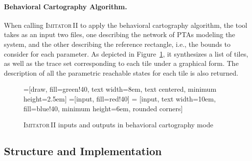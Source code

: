 \documentclass[a4paper,10pt]{article}
\newcommand{\A}{\mathcal{A}}
\newcommand{\imitatordeux}{\textsc{Imitator}\,II}
\newcommand{\paragraphe}[1]{\paragraph{#1.}}
\begin{document}
\paragraphe{Behavioral Cartography Algorithm}
When calling \imitatordeux{} to apply the behavioral cartography algorithm, the tool takes as an input two files, one describing the network of PTAs modeling the system, and the other describing the reference rectangle, i.e., the bounds to consider for each parameter.
As depicted in Figure~\ref{fig:ioBC}, it synthesizes a list of tiles, as well as the trace set corresponding to each tile under a graphical form.
The description of all the parametric reachable states for each tile is also returned.

\begin{figure}[ht!]
=[draw, fill=green!40, text width=8em,
    text centered, minimum height=2.5em]
=[input, fill=red!40]
 = [input, text width=10em, fill=blue!40,
    minimum height=6em, rounded corners]
\def\blockdist{2.3}
\def\edgedist{2.5}

{

\centering


}

\caption{\imitatordeux{} inputs and outputs in behavioral cartography mode}
\label{fig:ioBC}
\end{figure}



\subsection{Structure and Implementation}
\end{document}

